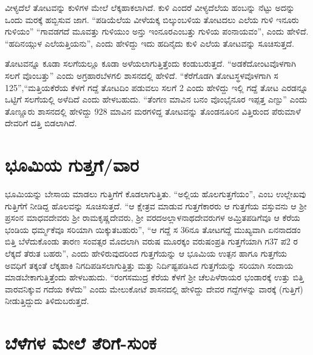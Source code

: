 ವೀಳ್ಯದೆಲೆ ತೋಟವನ್ನು ಕುಳಿಗಳ ಮೇಲೆ ಲೆಕ್ಕಹಾಕಲಾಗಿದೆ. ಕುಳಿ ಎಂದರೆ ವೀಳ್ಯದೆಲೆಯ ಹಂಬನ್ನು ನೆಟ್ಟು ಅದನ್ನು ಒಂದು ಮರಕ್ಕೆ ಹಬ್ಬಿಸುವ ಜಾಗ. “ಪಡಿಯೆಲೆಯ ವೀಳೆಯಕ್ಕ ಬಿಲ್ಕುಂಬಳಿಯ ತೋಟದಲು ಎಲೆಯ ಗುಳಿ ಇನೂರು ಗುಳಿಯಂ” “ಗಾವಡಗದೆ ಮೂವತ್ತು ಗುಳಿಯುಂ ಅನ್ತು ಇಂನೂರಎಂಬತ್ತು ಗುಳಿಯ ಪಂನಾಯವಂ”, ಎಂದು ಹೇಳಿದೆ. “ಹದಿನಯ್ಗುಳ ಎಲೆಯತ್ತಿಯನು”, ಎಂದು ಹೇಳಿದ್ದು ಇದು ಹದಿನೈದು ಕುಳಿ ಎಲೆಯ ತೋಟವನ್ನು ಸೂಚಿಸುತ್ತದೆ.

ತೋಟವನ್ನೂ ಕೂಡಾ ಸಲಗೆಯಲ್ಲೂ ಕೂಡಾ ಅಳೆಯಲಾಗುತ್ತಿತ್ತೆಂದು ಕಂಡುಬರುತ್ತದೆ. “ಅಡಕೆದೋಂಟವೊಳ\-ಗಾಗಿ ಸಲಗೆ ವೊಂಬತ್ತು” ಎಂದು ಅಗ್ರಹಾರಬೆಳಗಲಿ ಶಾಸನದಲ್ಲಿ ಹೇಳಿದೆ. “ಕೆರೆಗೊಡಗಿ ತೋಟಸ್ಥಳವೊಳಗಾಗಿ ಸ 125”,\break “ಮತ್ತಿಯಕೆರೆಯ ಕೆಳಗೆ ಗದ್ದೆ ತೋಟದಿಂ ಪಡುವಲು ಸಲಗೆ 2 ಎಂದು ಹೇಳಿದ್ದು ಇಲ್ಲಿ ಗದ್ದೆ ತೋಟ ಎರಡನ್ನೂ ಒಟ್ಟಿಗೆ ಸಲಗೆಯಲ್ಲಿ ಅಳೆದಿದೆ ಎಂದು ಹೇಳಬಹುದು. “ತೆಂಗಣ ಮಾವಿನ ಬನಂ ವೊಂಭೈನೂರ ಇಪ್ಪತ್ತ ಎಣ್ಟು” ಎಂದು ತೊಣ್ಣೂರು ಶಾಸನದಲ್ಲಿ ಹೇಳಿದ್ದು 928 ಮಾವಿನ ಮರಗಳಿದ್ದ ತೋಟವನ್ನು ತೊಂಡನೂರಿನ ವಿತ್ತಿರುಂದ ಪೆರುಮಾಳೆ ದೇವರಿಗೆ ದತ್ತಿ ಬಿಡಲಾಗಿದೆ.

\section*{ಭೂಮಿಯ ಗುತ್ತಗೆ/ವಾರ}

ಭೂಮಿಯನ್ನು ಬೇಸಾಯ ಮಾಡಲು ಗುತ್ತಿಗೆಗೆ ಕೊಡಲಾಗುತ್ತಿತು. “ಅಲ್ಲಿಯ ಹೊಲಗುತ್ತಗೆಯಂ”, ಎಂಬ ಉಲ್ಲೇಖವು ಗುತ್ತಿಗೆಗೆ ನೀಡಿದ್ದ ಹೊಲವನ್ನು ಸೂಚಿಸುತ್ತದೆ. “ಆ ಕ್ಷೇತ್ರವ ಮಾಡುವ ಗುತ್ತಗೆಕಾರರು ಆ ಗುತ್ತಗೆಯ ವಸ್ತುವನು ಆ ಶ‍್ರೀ ಪ್ರಸಂನ ಮಾಧವದೇವರು ಶ‍್ರೀ ರಾಮಕೃಷ್ಣದೇವರು, ಶ‍್ರೀ ವರದಅಲ್ಲಾಳನಾಥದೇವರುಗಳ ಅಮ್ರಿತಪಡಿಗೆವೂ ಆ ಕೆರೆಯ ಭಂಡಿಯ ಧರ್ಮ್ಮಕೆವೂ ಸರಿಯಾಗಿ ಯಿಕ್ಕುತಬಹುರು”, “ಆ ಗದ್ದೆ ಸ 36ನೂ ತೋಟಗದ್ದೆ ಮುಖ್ಯವಾಗಿ ಏನನಾದಡಂ ಬಿತ್ತಿ ಬೆಳೆದುಕೊಂಡು ತಾರಣ ಸಂವತ್ಸರ ಮೊದಲಾಗಿ ವರುಷ ಮೂರಕ್ಕಂ ವರುಷಂಪ್ರತಿ ಗುತ್ತಗೆಯಾಗಿ ಗ37 ಪ2 ರ ಲೆಕ್ಕದೆ ತೆರುತ ಬಹರು”, ಎಂದು ಹೇಳಿರುವುದರಿಂದ ಗುತ್ತಗೆಯನ್ನು ಆ ಭೂಮಿಯ ಉತ್ಪನ ಹಾಗೂ ಗುತ್ತಗೆಯ ಅವಧಿಗೆ ತಕ್ಕಂತೆ ಲೆಕ್ಕಹಾಕಿ ನಿಗದಿಪಡಿಸಲಾಗುತ್ತಿತ್ತು ಮತ್ತು ನಿರ್ದಿಷ್ಟಪಡಿಸಿದ ಗುತ್ತಗೆಯನ್ನು ಸರಿಯಾಗಿ ಸಂದಾಯ ಮಾಡಬೇಕಾಗುತ್ತಿತ್ತೆಂದು ಹೇಳಬಹುದು. “ರಂಗಸಮುದ್ರ ಕೆರೆಯ ಕೆಳಗೆ ಶ‍್ರೀ ಚೆಲಪಿಳೆರಾಯರ ಭಂಡಾರಕ್ಕೆ ಉತ್ತು ಬಿತ್ತಿ ವಾರವನಿಕ್ಕುವ ಗದೆಯ ಕಳೆದು” ಎಂದು ಮೇಲುಕೋಟೆ ಶಾಸನದಲ್ಲಿ ಹೇಳಿದ್ದು ದೇವರ ಗದ್ದೆಗಳನ್ನು ವಾರಕ್ಕೆ (ಗುತ್ತಿಗೆ) ನೀಡುತ್ತಿದ್ದುದು ತಿಳಿದುಬರುತ್ತದೆ.

\section*{ಬೆಳೆಗಳ ಮೇಲೆ ತೆರಿಗೆ-ಸುಂಕ}

